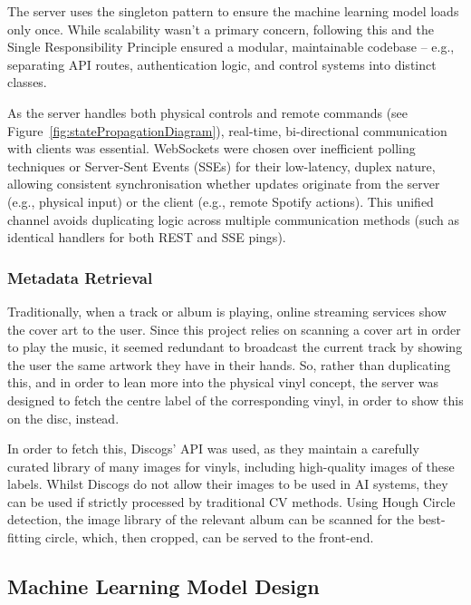             The server uses the singleton pattern to ensure the machine learning model loads only once. While scalability wasn't a primary concern, following this and the Single Responsibility Principle ensured a modular, maintainable codebase -- e.g., separating API routes, authentication logic, and control systems into distinct classes.
    
            As the server handles both physical controls and remote commands (see Figure~\ref{fig:statePropagationDiagram}), real-time, bi-directional communication with clients was essential. WebSockets were chosen over inefficient polling techniques or Server-Sent Events (SSEs) for their low-latency, duplex nature, allowing consistent synchronisation whether updates originate from the server (e.g., physical input) or the client (e.g., remote Spotify actions). This unified channel avoids duplicating logic across multiple communication methods (such as identical handlers for both REST and SSE pings).
        
            \subsubsection{Metadata Retrieval}
    
                Traditionally, when a track or album is playing, online streaming services show the cover art to the user. Since this project relies on scanning a cover art in order to play the music, it seemed redundant to broadcast the current track by showing the user the same artwork they have in their hands. So, rather than duplicating this, and in order to lean more into the physical vinyl concept, the server was designed to fetch the centre label of the corresponding vinyl, in order to show this on the disc, instead.
    
                In order to fetch this, Discogs' API was used, as they maintain a carefully curated library of many images for vinyls, including high-quality images of these labels. Whilst Discogs do not allow their images to be used in AI systems, they can be used if strictly processed by traditional CV methods. Using Hough Circle detection, the image library of the relevant album can be scanned for the best-fitting circle, which, then cropped, can be served to the front-end.
          
        \subsection{Machine Learning Model Design} \label{sec:mlDesign}
    
